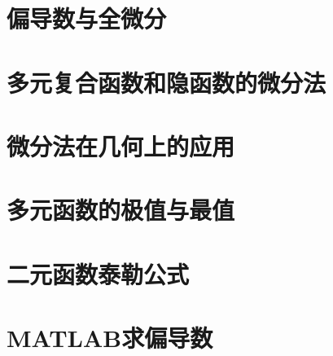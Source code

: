 \section{偏导数与全微分}

\section{多元复合函数和隐函数的微分法}

\section{微分法在几何上的应用}

\section{多元函数的极值与最值}

\section{二元函数泰勒公式}

\section{MATLAB求偏导数}